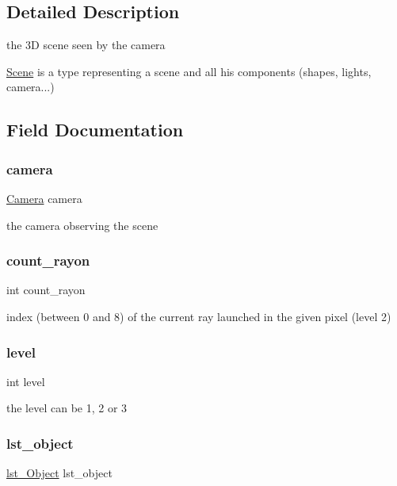 \subsection{Detailed Description}
the 3D scene seen by the camera 

\hyperlink{struct_scene}{Scene} is a type representing a scene and all his components (shapes, lights, camera...) 

\subsection{Field Documentation}
\mbox{\label{struct_scene_a2008f4ab70b5e4104c2ca43932536ddf}} 
\subsubsection{\texorpdfstring{camera}{camera}}
{\footnotesize\ttfamily \hyperlink{struct_camera}{Camera} camera}

the camera observing the scene \mbox{\label{struct_scene_a413744f68ce61704d543f5a8920f0d49}} 
\subsubsection{\texorpdfstring{count\+\_\+rayon}{count\_rayon}}
{\footnotesize\ttfamily int count\+\_\+rayon}

index (between 0 and 8) of the current ray launched in the given pixel (level 2) \mbox{\label{struct_scene_acf4d33ee4cff36f69b924471174dcb11}} 
\subsubsection{\texorpdfstring{level}{level}}
{\footnotesize\ttfamily int level}

the level can be 1, 2 or 3 \mbox{\label{struct_scene_ad1a9dde1f53b5136da8ba5fd10417eb5}} 
\subsubsection{\texorpdfstring{lst\+\_\+object}{lst\_object}}
{\footnotesize\ttfamily \hyperlink{structlst___object}{lst\+\_\+\+Object} lst\+\_\+object}

